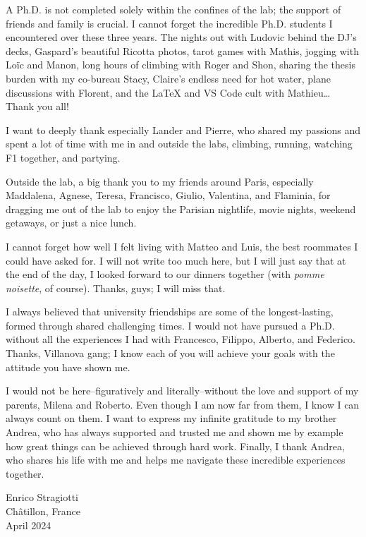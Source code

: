 \vspace{8mm}

A Ph.D. is not completed solely within the confines of the lab; the support of friends and family is crucial. I cannot forget the incredible Ph.D. students I encountered over these three years. The nights out with Ludovic behind the DJ's decks, Gaspard's beautiful Ricotta photos, tarot games with Mathis, jogging with Loïc and Manon, long hours of climbing with Roger and Shon, sharing the thesis burden with my co-bureau Stacy, Claire's endless need for hot water, plane discussions with Florent, and the LaTeX and VS Code cult with Mathieu… Thank you all!

I want to deeply thank especially Lander and Pierre, who shared my passions and spent a lot of time with me in and outside the labs, climbing, running, watching F1 together, and partying.

Outside the lab, a big thank you to my friends around Paris, especially Maddalena, Agnese, Teresa, Francisco, Giulio, Valentina, and Flaminia, for dragging me out of the lab to enjoy the Parisian nightlife, movie nights, weekend getaways, or just a nice lunch.

I cannot forget how well I felt living with Matteo and Luis, the best roommates I could have asked for. I will not write too much here, but I will just say that at the end of the day, I looked forward to our dinners together (with \textit{pomme noisette}, of course). Thanks, guys; I will miss that.

I always believed that university friendships are some of the longest-lasting, formed through shared challenging times. I would not have pursued a Ph.D. without all the experiences I had with Francesco, Filippo, Alberto, and Federico. Thanks, Villanova gang; I know each of you will achieve your goals with the attitude you have shown me.

I would not be here--figuratively and literally--without the love and support of my parents, Milena and Roberto. Even though I am now far from them, I know I can always count on them. I want to express my infinite gratitude to my brother Andrea, who has always supported and trusted me and shown me by example how great things can be achieved through hard work. Finally, I thank Andrea, who shares his life with me and helps me navigate these incredible experiences together.

\vspace{12mm}

\begin{flushright}
    Enrico Stragiotti \\
    Châtillon, France\\
    April 2024
\end{flushright}
\newpage